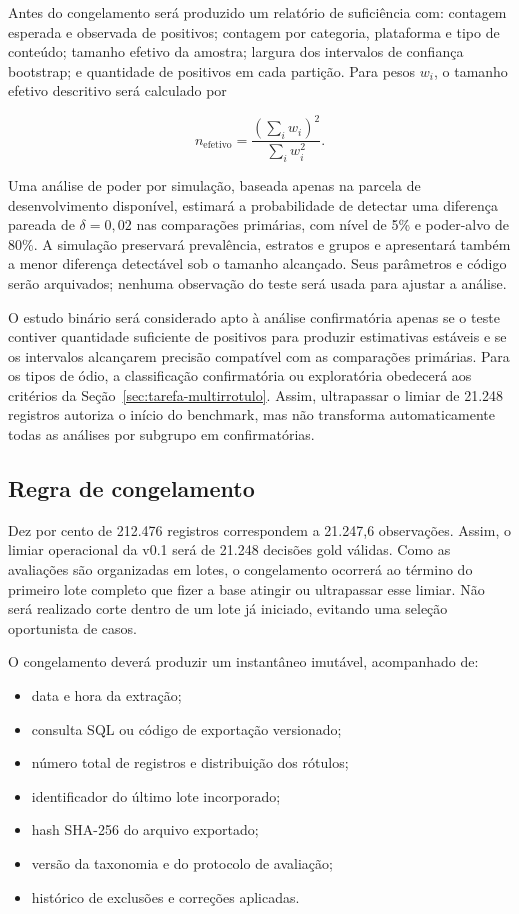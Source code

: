 Antes do congelamento será produzido um relatório de suficiência com: contagem
esperada e observada de positivos; contagem por categoria, plataforma e tipo de
conteúdo; tamanho efetivo da amostra; largura dos intervalos de confiança
bootstrap; e quantidade de positivos em cada partição. Para pesos $w_i$, o
tamanho efetivo descritivo será calculado por

\begin{equation}
    n_{\mathrm{efetivo}} =
    \frac{\left(\sum_i w_i\right)^2}{\sum_i w_i^2}.
\end{equation}

Uma análise de poder por simulação, baseada apenas na parcela de desenvolvimento
disponível, estimará a probabilidade de detectar uma diferença pareada de
$\delta=0{,}02$ nas comparações primárias, com nível de 5\% e poder-alvo de 80\%.
A simulação preservará prevalência, estratos e grupos e apresentará também a
menor diferença detectável sob o tamanho alcançado. Seus parâmetros e código
serão arquivados; nenhuma observação do teste será usada para ajustar a análise.

O estudo binário será considerado apto à análise confirmatória apenas se o teste
contiver quantidade suficiente de positivos para produzir estimativas estáveis e
se os intervalos alcançarem precisão compatível com as comparações primárias.
Para os tipos de ódio, a classificação confirmatória ou exploratória obedecerá
aos critérios da Seção~\ref{sec:tarefa-multirrotulo}. Assim, ultrapassar o limiar
de 21.248 registros autoriza o início do benchmark, mas não transforma automaticamente
todas as análises por subgrupo em confirmatórias.

\subsection{Regra de congelamento}

Dez por cento de 212.476 registros correspondem a 21.247,6 observações. Assim,
o limiar operacional da v0.1 será de 21.248 decisões gold válidas. Como as
avaliações são organizadas em lotes, o congelamento ocorrerá ao término do
primeiro lote completo que fizer a base atingir ou ultrapassar esse limiar. Não
será realizado corte dentro de um lote já iniciado, evitando uma seleção
oportunista de casos.

O congelamento deverá produzir um instantâneo imutável, acompanhado de:

\begin{itemize}
    \item data e hora da extração;
    \item consulta SQL ou código de exportação versionado;
    \item número total de registros e distribuição dos rótulos;
    \item identificador do último lote incorporado;
    \item hash SHA-256 do arquivo exportado;
    \item versão da taxonomia e do protocolo de avaliação;
    \item histórico de exclusões e correções aplicadas.
\end{itemize}

